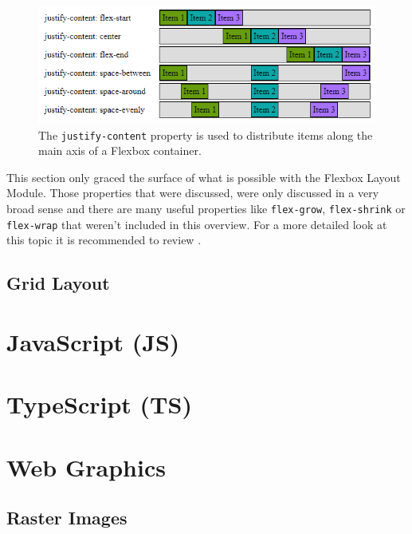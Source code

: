\begin{figure}[tp]
    \centering
    \includegraphics[keepaspectratio,width=\linewidth,height=\fullh / 3]
    {images/flexbox-justify-content.png}

    \caption[Flexbox Justify Content Property]{
        The \lstinline{justify-content} property is used to distribute items along the main axis of a Flexbox container.
    }
    \label{fig:FlexboxJustifyContent}
\end{figure}

This section only graced the surface of what is possible with the Flexbox Layout Module. Those properties that were discussed, were only discussed in a very broad sense and there are many useful properties like \lstinline{flex-grow}, \lstinline{flex-shrink} or \lstinline{flex-wrap} that weren't included in this overview. For a more detailed look at this topic it is recommended to review \cite{CSSFlexbox}.

\subsection{Grid Layout}

\section{JavaScript (JS)}

\section{TypeScript (TS)}

\section{Web Graphics}

\subsection{Raster Images}

